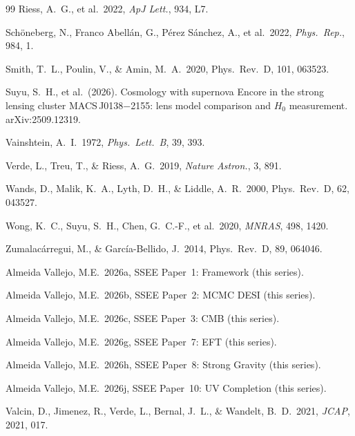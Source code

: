 \documentclass[12pt,a4paper]{article}
\newcommand{\prd}{Phys.\ Rev.\ D}
\begin{document}
\begin{thebibliography}{99}
Riess, A.~G., et al.\ 2022, \textit{ApJ Lett.}, 934, L7.

Sch\"oneberg, N., Franco Abell\'an, G., P\'erez S\'anchez, A., et al.\ 2022,
\textit{Phys.\ Rep.}, 984, 1.

Smith, T.~L., Poulin, V., \& Amin, M.~A.\ 2020, \prd, 101, 063523.

Suyu, S.~H., et al.\ (2026).
Cosmology with supernova Encore in the strong lensing cluster
MACS\,J0138$-$2155: lens model comparison and $H_0$ measurement.
arXiv:2509.12319.

Vainshtein, A.~I.\ 1972, \textit{Phys.\ Lett.\ B}, 39, 393.

Verde, L., Treu, T., \& Riess, A.~G.\ 2019, \textit{Nature Astron.}, 3, 891.

Wands, D., Malik, K.~A., Lyth, D.~H., \& Liddle, A.~R.\ 2000, \prd, 62, 043527.

Wong, K.~C., Suyu, S.~H., Chen, G.~C.-F., et al.\ 2020,
\textit{MNRAS}, 498, 1420.

Zumalac\'arregui, M., \& Garc\'ia-Bellido, J.\ 2014, \prd, 89, 064046.

Almeida Vallejo, M.E.\ 2026a, SSEE Paper~1: Framework (this series).

Almeida Vallejo, M.E.\ 2026b, SSEE Paper~2: MCMC DESI (this series).

Almeida Vallejo, M.E.\ 2026c, SSEE Paper~3: CMB (this series).

Almeida Vallejo, M.E.\ 2026g, SSEE Paper~7: EFT (this series).

Almeida Vallejo, M.E.\ 2026h, SSEE Paper~8: Strong Gravity (this series).

Almeida Vallejo, M.E.\ 2026j, SSEE Paper~10: UV Completion (this series).

Valcin, D., Jimenez, R., Verde, L., Bernal, J.~L., \& Wandelt, B.~D.\ 2021,
\textit{JCAP}, 2021, 017.

\end{thebibliography}
\end{document}
